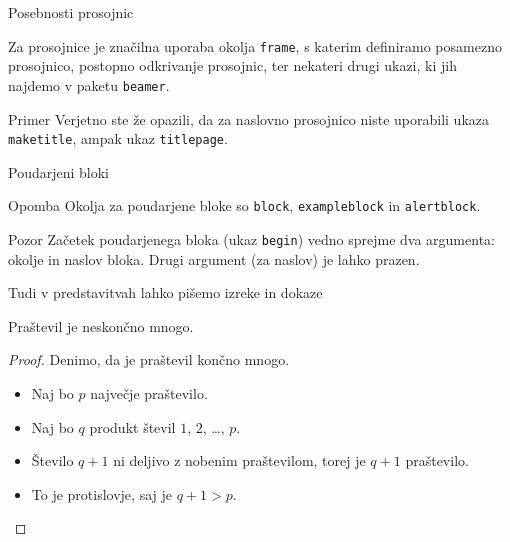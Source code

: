 \begin{frame}{Posebnosti prosojnic}

	Za prosojnice je značilna uporaba okolja \texttt{frame},
	s katerim definiramo posamezno prosojnico,
	\pause
	postopno odkrivanje prosojnic,
	\pause
	ter nekateri drugi ukazi, ki jih najdemo v paketu \texttt{beamer}.
	\pause
	\begin{exampleblock}{Primer}
		Verjetno ste že opazili, da za naslovno prosojnico niste uporabili
		ukaza \texttt{maketitle}, ampak ukaz \texttt{titlepage}.
	\end{exampleblock}
\end{frame}

\begin{frame}{Poudarjeni bloki}

		
		\begin{block}{Opomba}
			Okolja za poudarjene bloke so \texttt{block}, \texttt{exampleblock} in \texttt{alertblock}.
		\end{block}

		
		\begin{alertblock}{Pozor}
			Začetek poudarjenega bloka (ukaz \texttt{begin}) vedno sprejme 
			dva argumenta: okolje in naslov bloka.
			Drugi argument (za naslov) je lahko prazen. 
		\end{alertblock}
\end{frame}

\begin{frame}{Tudi v predstavitvah lahko pišemo izreke in dokaze}

	\begin{izrek}
	   Praštevil je neskončno mnogo.
	\end{izrek}
	\begin{proof}
	   Denimo, da je praštevil končno mnogo.
	   \begin{itemize}
		  \item<+-> Naj bo \(p\) \alert{največje} praštevilo.
		  \item<+-> Naj bo \(q\) produkt števil \(1\), \(2\), \ldots, \(p\).
		  \item<+-> Število \(q+1\) ni deljivo z nobenim praštevilom, torej je \(q+1\) praštevilo.
		  \item<+-> To je protislovje, saj je \(q+1>p\). \qedhere
	   \end{itemize}
	\end{proof}
 \end{frame}
 
